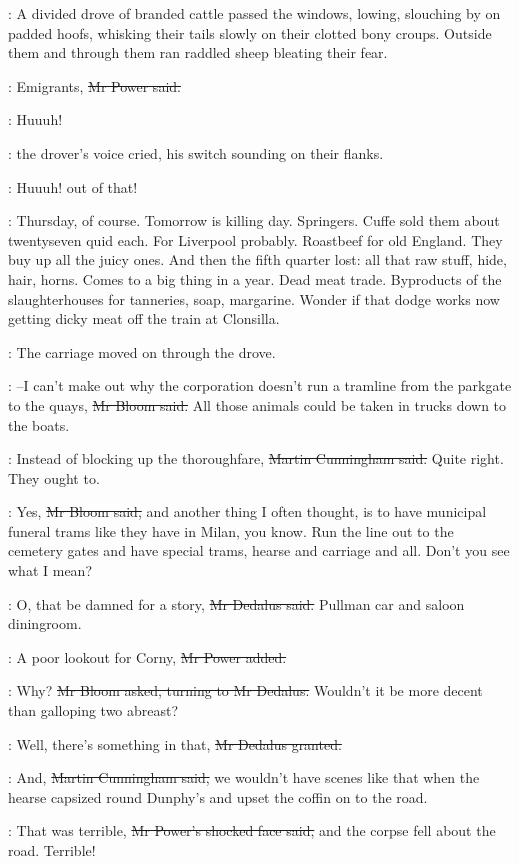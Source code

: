 :
A divided drove of branded cattle passed the windows,
lowing,
slouching by on padded hoofs,
whisking their tails slowly on their clotted bony croups.
Outside them and through them ran
raddled sheep bleating their fear.

\power:
Emigrants,
\sout{Mr Power said.}

\drover:
Huuuh!

:
the drover's voice cried,
his switch sounding on their flanks.

\drover:
Huuuh!
out of that!

\BloomInt:
Thursday, of course.
Tomorrow is killing day.
Springers.
Cuffe sold them about twentyseven quid each.
For Liverpool probably.
Roastbeef for old England.
They buy up all the juicy ones.
And then the fifth quarter lost:
all that raw stuff, hide, hair, horns.
Comes to a big thing in a year.
Dead meat trade.
Byproducts of the slaughterhouses for tanneries, soap, margarine.
Wonder if that dodge works now
getting dicky meat off the train at Clonsilla.

:
The carriage moved on through the drove.


\BloomInt:
--I can't make out why the corporation doesn't run a tramline
from the parkgate to the quays,
\sout{Mr Bloom said.}
All those animals could be taken in trucks down to the boats.

\cunningham:
Instead of blocking up the thoroughfare,
\sout{Martin Cunningham said.}
Quite right.
They ought to.

\Bloom:
Yes,
\sout{Mr Bloom said,}
and another thing I often thought,
is to have municipal funeral trams like they have in Milan, you know.
Run the line out to the cemetery gates and have special trams,
hearse and carriage and all.
Don't you see what I mean?

\simon:
O, that be damned for a story,
\sout{Mr Dedalus said.}
Pullman car and saloon diningroom.

\power:
A poor lookout for Corny,
\sout{Mr Power added.}

\Bloom:
Why?
\sout{Mr Bloom asked, turning to Mr Dedalus.}
Wouldn't it be more decent than galloping two abreast?

\simon:
Well, there's something in that,
\sout{Mr Dedalus granted.}

\cunningham:
And,
\sout{Martin Cunningham said,}
we wouldn't have scenes like that
when the hearse capsized round Dunphy's
and upset the coffin on to the road.

\power:
That was terrible,
\sout{Mr Power's shocked face said,}
and the corpse fell about the road.
Terrible!

